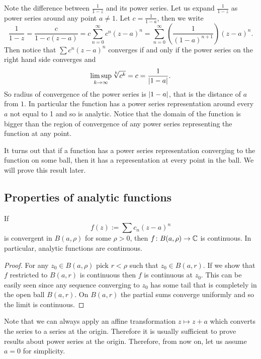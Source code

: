 Note the difference between $\frac{1}{1-z}$ and its power series.  Let us
expand $\frac{1}{1-z}$ as power series around any point $a \not= 1$.
Let $c = \frac{1}{1-a}$, then we write
\begin{equation*}
\frac{1}{1-z} = 
\frac{c}{1-c(z-a)}
=
c
\sum_{n=0}^\infty c^{n} {(z-a)}^n
=
\sum_{n=0}^\infty \left( \frac{1}{{(1-a)}^{n+1}} \right) {(z-a)}^n .
\end{equation*}
Then notice that $\sum c^n {(z-a)}^n$ converges if and only if 
the power series on the right hand side converges and
\begin{equation*}
\limsup_{k\to\infty}
\sqrt[k]{c^k} = c
= \frac{1}{\lvert {1-a} \rvert} .
\end{equation*}
So radius of convergence of the power series is $\lvert {1-a} \rvert$, that is the
distance of $a$ from $1$.  In particular the function has a power series
representation around every $a$ not equal to 1 and so is analytic.
Notice that the domain of the function is bigger than the region
of convergence of any power series representing the function at any point.

It turns out that 
if a function has a power series representation converging to the function
on some ball,
then it has a representation at every point in the ball.  We will prove this
result later.

\subsection{Properties of analytic functions}

\begin{prop}
If
\begin{equation*}
f(z) := \sum c_n {(z-a)}^n
\end{equation*}
is convergent in $B(a,\rho)$ for some $\rho > 0$, then
$f \colon B(a,\rho) \to {\mathbb{C}}$ is continuous.
In particular, analytic functions are continuous.
\end{prop}

\begin{proof}
For any $z_0 \in B(a,\rho)$ pick $r < \rho$ such that $z_0 \in B(a,r)$.
If we show
that $f$ restricted to $B(a,r)$ is continuous then $f$ is continuous at
$z_0$.  This can be easily seen since any sequence converging to
$z_0$ has some tail that is completely in the open ball $B(a,r)$.  On $B(a,r)$ the
partial sums converge uniformly and so the limit is
continuous.
\end{proof}

Note that we can always apply an affine transformation $z \mapsto z+a$ which
converts the series to a series at the origin.  Therefore it is usually
sufficient to prove results about power series at the origin.
Therefore, from now on, let us assume $a=0$ for simplicity.

